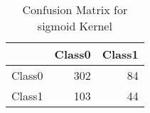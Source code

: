 \begin{table}[H]
\centering
\begin{tabular}{rrr}
  \hline
 & Class0 & Class1 \\ 
  \hline
Class0 & 302 &  84 \\ 
  Class1 & 103 &  44 \\ 
   \hline
\end{tabular}
\caption{Confusion Matrix for sigmoid Kernel} 
\end{table}





